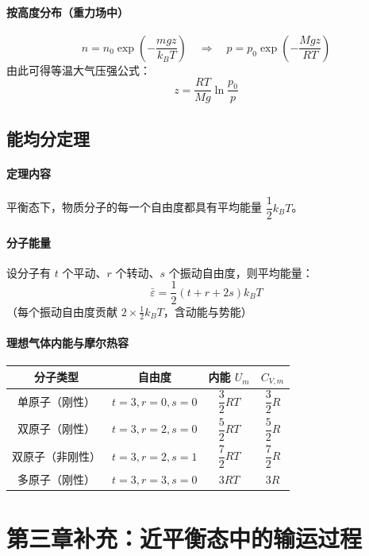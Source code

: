 \documentclass[UTF8]{ctexart}
\begin{document}
\paragraph{按高度分布（重力场中）}
\[
n=n_0\exp\!\left(-\frac{mgz}{k_B T}\right)
\quad\Longrightarrow\quad
p=p_0\exp\!\left(-\frac{Mgz}{RT}\right)
\]
由此可得等温大气压强公式：
\[
\boxed{z=\frac{RT}{Mg}\ln\frac{p_0}{p}}
\]

\subsection{能均分定理}

\paragraph{定理内容}
平衡态下，物质分子的每一个自由度都具有平均能量 $\dfrac{1}{2}k_B T$。

\paragraph{分子能量}
设分子有 $t$ 个平动、$r$ 个转动、$s$ 个振动自由度，则平均能量：
\[
\boxed{\bar{\varepsilon}=\frac{1}{2}(t+r+2s)k_B T}
\]
（每个振动自由度贡献 $2\times\frac{1}{2}k_B T$，含动能与势能）

\paragraph{理想气体内能与摩尔热容}
\begin{center}
\begin{tabular}{c|c|c|c}
\hline
分子类型 & 自由度 & 内能 $U_m$ & $C_{V,m}$ \\
\hline
单原子（刚性） & $t=3,r=0,s=0$ & $\dfrac{3}{2}RT$ & $\dfrac{3}{2}R$ \\
双原子（刚性） & $t=3,r=2,s=0$ & $\dfrac{5}{2}RT$ & $\dfrac{5}{2}R$ \\
双原子（非刚性） & $t=3,r=2,s=1$ & $\dfrac{7}{2}RT$ & $\dfrac{7}{2}R$ \\
多原子（刚性） & $t=3,r=3,s=0$ & $3RT$ & $3R$ \\
\hline
\end{tabular}
\end{center}


\section{第三章补充：近平衡态中的输运过程}
\end{document}

